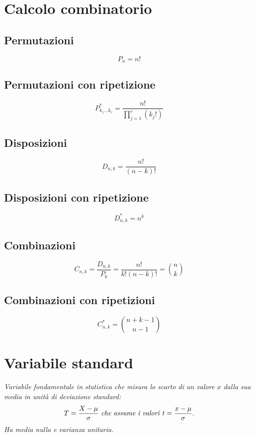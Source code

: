 \section{Calcolo combinatorio} %
\label{sec:calc-combinatorio}
\subsection{Permutazioni}
\begin{equation}
{ P }_{ n }=n!
\end{equation}
\subsection{Permutazioni con ripetizione}
\begin{equation}
{ P }_{ { k }_{ 1 }\dots { k }_{ r } }^{ * }=\frac { n! }{ \prod _{ j=1 }^{ r }{ ({ k }_{ j }!) }  } 
\end{equation}
\subsection{Disposizioni}
\begin{equation}
{ D }_{ n,k }=\frac { n! }{ (n-k)! } 
\end{equation}
\subsection{Disposizioni con ripetizione}
\begin{equation}
{ D }_{ n,k }^{ * }=n^{k}
\end{equation}
\subsection{Combinazioni}
\begin{equation}
{ C }_{ n,k }=\frac { { D }_{ n,k } }{ { P }_{ k } } =\frac { n! }{ k!(n-k)! } = {n \choose k}
\end{equation}
\subsection{Combinazioni con ripetizioni}
\begin{equation}
{ C }_{ n,k }^{ * }={n+k-1 \choose n-1} 
\end{equation}

\section{Variabile standard} %
\label{sec:var-standard}
\emph{Variabile fondamentale in statistica che misura lo scarto di un valore $x$ dalla sua media in unità di deviazione standard:
\begin{equation}
T=\frac { X-\mu  }{ \sigma  } \textrm{ \emph{che assume i valori} } t=\frac { x-\mu  }{ \sigma  } .
\end{equation}
Ha media nulla e varianza unitaria.}

